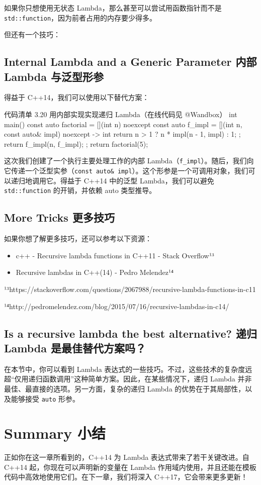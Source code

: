 如果你只想使用无状态 Lambda，那么甚至可以尝试用函数指针而不是 \texttt{std::function}，因为前者占用的内存要少得多。

但还有一个技巧：

\subsection{Internal Lambda and a Generic Parameter 内部 Lambda 与泛型形参}

得益于 C++14，我们可以使用以下替代方案：

\begin{codeboxt}{代码清单 3.20 用内部实现实现递归 Lambda（在线代码见 @Wandbox）}
int main() {
const auto factorial = [](int n) noexcept {
const auto f_impl = [](int n, const auto& impl) noexcept -> int {
return n > 1 ? n * impl(n - 1, impl) : 1;
};
return f_impl(n, f_impl);
};
return factorial(5);
}
\end{codeboxt}

这次我们创建了一个执行主要处理工作的内部 Lambda（\texttt{f\_impl}）。随后，我们向它传递一个泛型实参（\texttt{const auto\& impl}）。这个形参是一个可调用对象，我们可以递归地调用它。得益于 C++14 中的泛型 Lambda，我们可以避免 \texttt{std::function} 的开销，并依赖 auto 类型推导。

\subsection{More Tricks 更多技巧}

如果你想了解更多技巧，还可以参考以下资源：
\begin{itemize}
\item c++ - Recursive lambda functions in C++11 - Stack Overflow¹³
\item Recursive lambdas in C++(14) - Pedro Melendez¹⁴
\end{itemize}

¹³https://stackoverflow.com/questions/2067988/recursive-lambda-functions-in-c11

¹⁴http://pedromelendez.com/blog/2015/07/16/recursive-lambdas-in-c14/

\subsection{Is a recursive lambda the best alternative? 递归 Lambda 是最佳替代方案吗？}

在本节中，你可以看到 Lambda 表达式的一些技巧。不过，这些技术的复杂度远超“仅用递归函数调用”这种简单方案。因此，在某些情况下，递归 Lambda 并非最佳、最直接的选项。另一方面，复杂的递归 Lambda 的优势在于其局部性，以及能够接受 \texttt{auto} 形参。

\section{Summary 小结}

正如你在这一章所看到的，C++14 为 Lambda 表达式带来了若干关键改进。自 C++14 起，你现在可以声明新的变量在 Lambda 作用域内使用，并且还能在模板代码中高效地使用它们。在下一章，我们将深入 C++17，它会带来更多更新！
